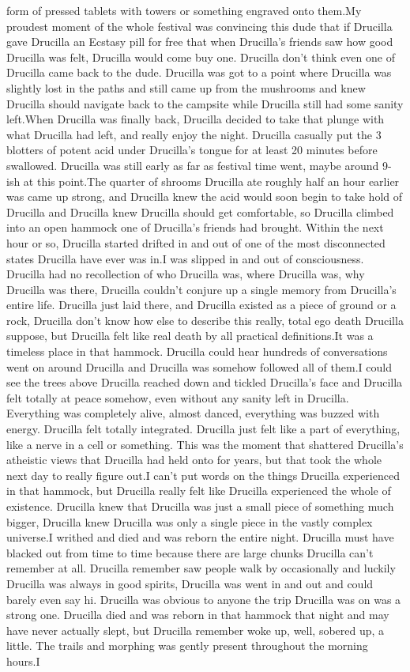 \documentclass[12pt]{book}
\begin{document}
form of pressed tablets with towers or something engraved onto them.My proudest moment of the whole festival was convincing this dude that if Drucilla gave Drucilla an Ecstasy pill for free that when Drucilla's friends saw how good Drucilla was felt, Drucilla would come buy one. Drucilla don't think even one of Drucilla came back to the dude. Drucilla was got to a point where Drucilla was slightly lost in the paths and still came up from the mushrooms and knew Drucilla should navigate back to the campsite while Drucilla still had some sanity left.When Drucilla was finally back, Drucilla decided to take that plunge with what Drucilla had left, and really enjoy the night. Drucilla casually put the 3 blotters of potent acid under Drucilla's tongue for at least 20 minutes before swallowed. Drucilla was still early as far as festival time went, maybe around 9-ish at this point.The quarter of shrooms Drucilla ate roughly half an hour earlier was came up strong, and Drucilla knew the acid would soon begin to take hold of Drucilla and Drucilla knew Drucilla should get comfortable, so Drucilla climbed into an open hammock one of Drucilla's friends had brought. Within the next hour or so, Drucilla started drifted in and out of one of the most disconnected states Drucilla have ever was in.I was slipped in and out of consciousness. Drucilla had no recollection of who Drucilla was, where Drucilla was, why Drucilla was there, Drucilla couldn't conjure up a single memory from Drucilla's entire life. Drucilla just laid there, and Drucilla existed as a piece of ground or a rock, Drucilla don't know how else to describe this really, total ego death Drucilla suppose, but Drucilla felt like real death by all practical definitions.It was a timeless place in that hammock. Drucilla could hear hundreds of conversations went on around Drucilla and Drucilla was somehow followed all of them.I could see the trees above Drucilla reached down and tickled Drucilla's face and Drucilla felt totally at peace somehow, even without any sanity left in Drucilla. Everything was completely alive, almost danced, everything was buzzed with energy. Drucilla felt totally integrated. Drucilla just felt like a part of everything, like a nerve in a cell or something. This was the moment that shattered Drucilla's atheistic views that Drucilla had held onto for years, but that took the whole next day to really figure out.I can't put words on the things Drucilla experienced in that hammock, but Drucilla really felt like Drucilla experienced the whole of existence. Drucilla knew that Drucilla was just a small piece of something much bigger, Drucilla knew Drucilla was only a single piece in the vastly complex universe.I writhed and died and was reborn the entire night. Drucilla must have blacked out from time to time because there are large chunks Drucilla can't remember at all. Drucilla remember saw people walk by occasionally and luckily Drucilla was always in good spirits, Drucilla was went in and out and could barely even say hi. Drucilla was obvious to anyone the trip Drucilla was on was a strong one. Drucilla died and was reborn in that hammock that night and may have never actually slept, but Drucilla remember woke up, well, sobered up, a little. The trails and morphing was gently present throughout the morning hours.I 
\end{document}
